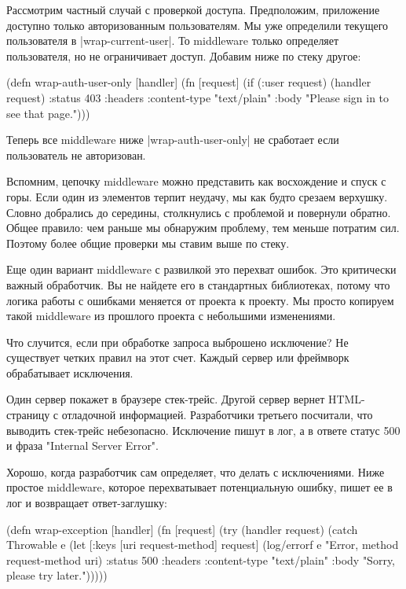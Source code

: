 Рассмотрим частный случай с проверкой доступа. Предположим, приложение доступно
только авторизованным пользователям. Мы уже определили текущего пользователя в
\spverb|wrap-current-user|. То middleware только определяет пользователя, но не
ограничивает доступ. Добавим ниже по стеку другое:

\begin{code}
(defn wrap-auth-user-only
  [handler]
  (fn [request]
    (if (:user request)
      (handler request)
      {:status 403
       :headers {:content-type "text/plain"}
       :body "Please sign in to see that page."})))
\end{code}

Теперь все middleware ниже \spverb|wrap-auth-user-only| не сработает если пользователь
не авторизован.

Вспомним, цепочку middleware можно представить как восхождение и спуск с
горы. Если один из элементов терпит неудачу, мы как будто срезаем
верхушку. Словно добрались до середины, столкнулись с проблемой и повернули
обратно. Общее правило: чем раньше мы обнаружим проблему, тем меньше потратим
сил. Поэтому более общие проверки мы ставим выше по стеку.

Еще один вариант middleware с развилкой это перехват ошибок. Это критически
важный обработчик. Вы не найдете его в стандартных библиотеках, потому что
логика работы с ошибками меняется от проекта к проекту. Мы просто копируем такой
middleware из прошлого проекта с небольшими изменениями.

Что случится, если при обработке запроса выброшено исключение? Не существует
четких правил на этот счет. Каждый сервер или фреймворк обрабатывает исключения.

Один сервер покажет в браузере стек-трейс. Другой сервер вернет HTML-страницу с
отладочной информацией. Разработчики третьего посчитали, что выводить стек-трейс
небезопасно. Исключение пишут в лог, а в ответе статус 500 и фраза "Internal
Server Error".

Хорошо, когда разработчик сам определяет, что делать с исключениями. Ниже
простое middleware, которое перехватывает потенциальную ошибку, пишет ее в лог и
возвращает ответ-заглушку:

\begin{code}
(defn wrap-exception
  [handler]
  (fn [request]
    (try
      (handler request)
      (catch Throwable e
        (let [{:keys [uri
                      request-method]} request]
          (log/errorf e "Error, method %
                      request-method uri)
          {:status 500
           :headers {:content-type "text/plain"}
           :body "Sorry, please try later."})))))
\end{code}

